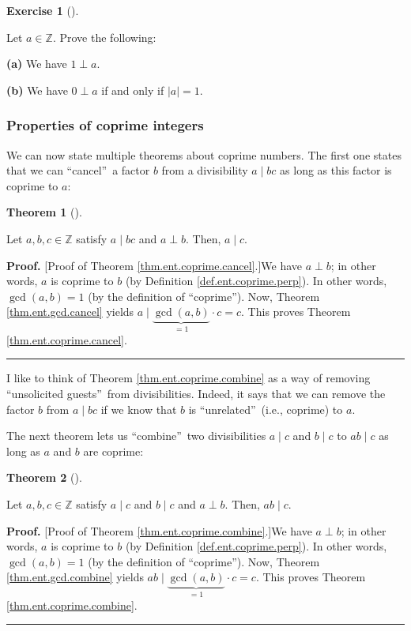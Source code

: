 \documentclass[numbers=enddot,12pt,final,onecolumn,notitlepage]{scrartcl}%
\newcounter{exer}
\numberwithin{exer}{subsection}
\theoremstyle{definition}
\newtheorem{theo}{Theorem}[subsection]
\newenvironment{theorem}[1][]
{\begin{theo}[#1]\begin{leftbar}}
{\end{leftbar}\end{theo}}
\newtheorem{exmp}[exer]{Exercise}
\newenvironment{exercise}[1][]
{\begin{exmp}[#1]\begin{leftbar}}
{\end{leftbar}\end{exmp}}
\newenvironment{proof}[1][Proof]{\noindent\textbf{#1.} }{\ \rule{0.5em}{0.5em}}
\begin{document}
\begin{exercise}
\label{exe.ent.coprime.01}Let $a\in\mathbb{Z}$. Prove the following:

\textbf{(a)} We have $1\perp a$.

\textbf{(b)} We have $0\perp a$ if and only if $\left\vert a\right\vert =1$.
\end{exercise}

\subsubsection{Properties of coprime integers}

We can now state multiple theorems about coprime numbers. The first one states
that we can \textquotedblleft cancel\textquotedblright\ a factor $b$ from a
divisibility $a\mid bc$ as long as this factor is coprime to $a$:

\begin{theorem}
\label{thm.ent.coprime.cancel}Let $a,b,c\in\mathbb{Z}$ satisfy $a\mid bc$ and
$a\perp b$. Then, $a\mid c$.
\end{theorem}

\begin{proof}
[Proof of Theorem \ref{thm.ent.coprime.cancel}.]We have $a\perp b$; in other
words, $a$ is coprime to $b$ (by Definition \ref{def.ent.coprime.perp}). In
other words, $\gcd\left(  a,b\right)  =1$ (by the definition of
\textquotedblleft coprime\textquotedblright). Now, Theorem
\ref{thm.ent.gcd.cancel} yields $a\mid\underbrace{\gcd\left(  a,b\right)
}_{=1}\cdot c=c$. This proves Theorem \ref{thm.ent.coprime.cancel}.
\end{proof}

I like to think of Theorem \ref{thm.ent.coprime.combine} as a way of removing
\textquotedblleft unsolicited guests\textquotedblright\ from divisibilities.
Indeed, it says that we can remove the factor $b$ from $a\mid bc$ if we know
that $b$ is \textquotedblleft unrelated\textquotedblright\ (i.e., coprime) to
$a$.

The next theorem lets us \textquotedblleft combine\textquotedblright\ two
divisibilities $a\mid c$ and $b\mid c$ to $ab\mid c$ as long as $a$ and $b$
are coprime:

\begin{theorem}
\label{thm.ent.coprime.combine}Let $a,b,c\in\mathbb{Z}$ satisfy $a\mid c$ and
$b\mid c$ and $a\perp b$. Then, $ab\mid c$.
\end{theorem}

\begin{proof}
[Proof of Theorem \ref{thm.ent.coprime.combine}.]We have $a\perp b$; in other
words, $a$ is coprime to $b$ (by Definition \ref{def.ent.coprime.perp}). In
other words, $\gcd\left(  a,b\right)  =1$ (by the definition of
\textquotedblleft coprime\textquotedblright). Now, Theorem
\ref{thm.ent.gcd.combine} yields $ab\mid\underbrace{\gcd\left(  a,b\right)
}_{=1}\cdot c=c$. This proves Theorem \ref{thm.ent.coprime.combine}.
\end{proof}
\end{document}
